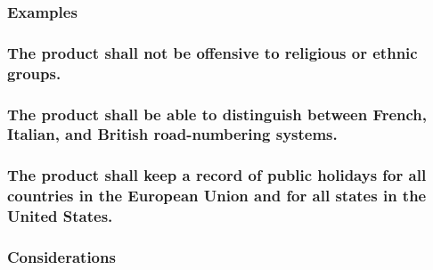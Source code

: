 \documentclass[
]{article}
\begin{document}
\hypertarget{examples-38}{%
\subsubsection{Examples}\label{examples-38}}

\hypertarget{the-product-shall-not-be-offensive-to-religious-or-ethnic-groups.}{%
\subsubsection{The product shall not be offensive to religious or ethnic
groups.}\label{the-product-shall-not-be-offensive-to-religious-or-ethnic-groups.}}

\hypertarget{the-product-shall-be-able-to-distinguish-between-french-italian-and-british-road-numbering-systems.}{%
\subsubsection{The product shall be able to distinguish between French,
Italian, and British road-numbering
systems.}\label{the-product-shall-be-able-to-distinguish-between-french-italian-and-british-road-numbering-systems.}}

\hypertarget{the-product-shall-keep-a-record-of-public-holidays-for-all-countries-in-the-european-union-and-for-all-states-in-the-united-states.}{%
\subsubsection{The product shall keep a record of public holidays for
all countries in the European Union and for all states in the United
States.}\label{the-product-shall-keep-a-record-of-public-holidays-for-all-countries-in-the-european-union-and-for-all-states-in-the-united-states.}}

\hypertarget{considerations-41}{%
\subsubsection{Considerations}\label{considerations-41}}
\end{document}
